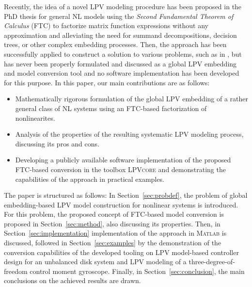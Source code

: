 Recently, the idea of a novel LPV modeling procedure has been proposed in the PhD thesis \citep{koelewijnAnalysisControlNonlinear2023} for general NL models using the \emph{Second Fundamental Theorem of Calculus} (FTC) to factorize matrix function expressions without any approximation and alleviating the need for summand decompositions, decision trees, or other complex embedding processes. Then, the approach has been successfully applied to construct a solution to various problems, such as in \citep{Toth23CDCj}, but has never been properly formulated and discussed as a global LPV embedding and model conversion tool and no software implementation has been developed for this purpose. In this paper, our main contributions are as follows:
\begin{itemize}
    \item Mathematically rigorous formulation of the global LPV embedding of a rather general class of NL systems using an FTC-based factorization of nonlinearites.
    \item Analysis of the properties of the resulting systematic LPV modeling process, discussing its pros and cons.
    \item  Developing a publicly available software implementation of the proposed FTC-based conversion in the toolbox \textsc{LPVcore} and demonstrating the capabilities of the approach in practical examples.
\end{itemize}

The paper is structured as follows: In Section~\ref{sec:probdef}, the problem of global embedding-based LPV model construction for nonlinear systems is introduced. For this problem, the proposed concept of FTC-based model conversion is proposed in Section~\ref{sec:method}, also discussing its properties. Then, in Section~\ref{sec:implementation} implementation of the approach in \textsc{Matlab} is discussed, followed in Section~\ref{sec:examples} by the demonstration of the conversion capabilities of the developed tooling on LPV model-based controller design for an unbalanced disk system and LPV modeling of a three-degree-of-freedom control moment gyroscope. Finally, in Section~\ref{sec:conclusion}, the main conclusions on the achieved results are drawn.





